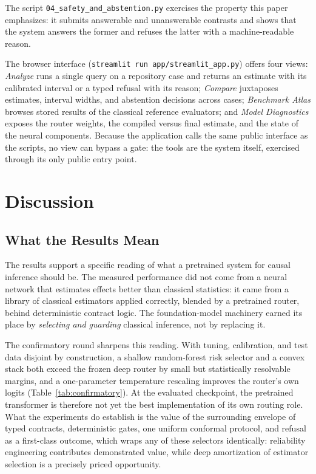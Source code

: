 \documentclass[electronics,article,submit,oneauthor]{Definitions/mdpi}
\begin{document}
The script \texttt{04\_safety\_and\_abstention.py} exercises the property this paper emphasizes: it submits answerable and unanswerable contrasts and shows that the system answers the former and refuses the latter with a machine-readable reason.

The browser interface (\texttt{streamlit run app/streamlit\_app.py}) offers four views: \emph{Analyze} runs a single query on a repository case and returns an estimate with its calibrated interval or a typed refusal with its reason; \emph{Compare} juxtaposes estimates, interval widths, and abstention decisions across cases; \emph{Benchmark Atlas} browses stored results of the classical reference evaluators; and \emph{Model Diagnostics} exposes the router weights, the compiled versus final estimate, and the state of the neural components. Because the application calls the same public interface as the scripts, no view can bypass a gate: the tools are the system itself, exercised through its only public entry point.

\section{Discussion}\label{sec:discussion}

\subsection{What the Results Mean}\label{sec:discussion-meaning}

The results support a specific reading of what a pretrained system for causal inference should be. The measured performance did not come from a neural network that estimates effects better than classical statistics: it came from a library of classical estimators applied correctly, blended by a pretrained router, behind deterministic contract logic. The foundation-model machinery earned its place by \emph{selecting and guarding} classical inference, not by replacing it.

The confirmatory round sharpens this reading. With tuning, calibration, and test data disjoint by construction, a shallow random-forest risk selector and a convex stack both exceed the frozen deep router by small but statistically resolvable margins, and a one-parameter temperature rescaling improves the router's own logits (Table~\ref{tab:confirmatory}). At the evaluated checkpoint, the pretrained transformer is therefore not yet the best implementation of its own routing role. What the experiments do establish is the value of the surrounding envelope of typed contracts, deterministic gates, one uniform conformal protocol, and refusal as a first-class outcome, which wraps any of these selectors identically: reliability engineering contributes demonstrated value, while deep amortization of estimator selection is a precisely priced opportunity.
\end{document}
